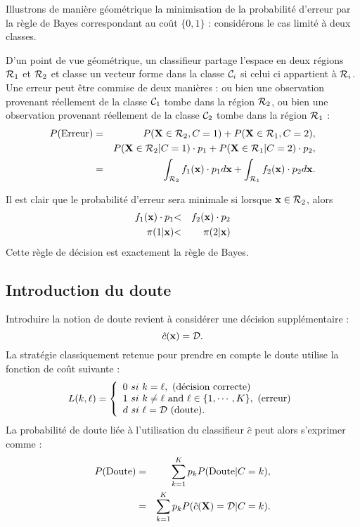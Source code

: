 \begin{ex}\label{ex:erreur}
Illustrons de mani\`ere g\'eom\'etrique la minimisation de la 
probabilit\'e d'erreur par la r\`egle de Bayes correspondant au co\^ut $\{0,1\}$ :
consid\'erons le cas limit\'e \`a deux classes.

D'un point de vue 
g\'eom\'etrique, un classifieur partage l'espace en deux r\'egions
${\cal R}_1$ et ${\cal R}_2$ et classe un vecteur forme dans la classe
${\cal C}_i$ si celui ci appartient \`a ${\cal R}_i$.     
Une erreur peut \^etre commise de deux mani\`eres : ou bien
une observation provenant r\'eellement de la classe ${\cal C}_1$ 
tombe dans la r\'egion ${\cal R}_2$, ou bien une observation 
provenant r\'eellement de la classe ${\cal C}_2$ 
tombe dans la r\'egion ${\cal R}_1$ :
\begin{eqnarray*}
P(\mbox{Erreur})& = &   P(\mbox{\bf X} \in {\cal R}_2,C=1)+P(\mbox{\bf X} \in {\cal R}_1,C=2),\\
& &  P(\mbox{\bf X} \in {\cal R}_2 | C=1) \cdot p_1 +  
P(\mbox{\bf X} \in {\cal R}_1 | C=2) \cdot p_2,\\
& = & \int_{{\cal R}_2} f_1(\mbox{\bf x} ) \cdot p_1 d\mbox{\bf x} +
\int_{{\cal R}_1} f_2(\mbox{\bf x} ) \cdot p_2 d\mbox{\bf x}.
\end{eqnarray*}

Il est clair que le probabilit\'e d'erreur sera minimale si lorsque
$\mbox{\bf x} \in {\cal R}_2$, alors 
\begin{eqnarray*}
 f_1(\mbox{\bf x}) \cdot p_1  & {<}  &  f_2(\mbox{\bf x}) \cdot  p_2 \\
 \pi (1 |\mbox{\bf x})        & {<}  &  \pi(2|\mbox{\bf x}) 
\end{eqnarray*}
Cette r\`egle de d\'ecision est exactement la r\`egle de Bayes.
\end{ex}

\subsection{Introduction du doute}

Introduire la notion de doute revient \`a consid\'erer une d\'ecision suppl\'ementaire :
$$
\hat{c}(\mbox{\bf x})={\cal D}.
$$
La strat\'egie classiquement retenue pour prendre en compte le  doute
utilise  la fonction de co\^ut suivante :
\begin{equation}
\label{eq:doute}
L(k,\ell)=
\left \{ \begin{array}{l}
0 \ si \ k=\ell, \ \mbox{(d\'ecision correcte)}\\
1 \ si \ k\neq \ell \ \mbox{and} \ \ell \in \{1,\cdots,K\},\  \mbox{(erreur)}\\
d \ si \ \ell={\cal D} \  \mbox{(doute)}.
\end{array}
\right .
\end{equation}
La probabilit\'e de doute li\'ee \`a l'utilisation du classifieur $\hat{c}$ peut alors
s'exprimer comme :
\begin{eqnarray*}
P(\mbox{Doute}) & =  & \sum_{k=1}^{K} p_k  P(\mbox{Doute} | C=k),\\
                 & =  & \sum_{k=1}^{K} p_k  P( \hat{c}(\mbox{\bf X})={\cal D}| C=k).
\end{eqnarray*}
 

